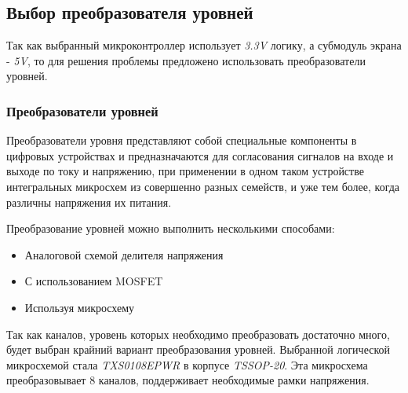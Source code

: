 \subsection{Выбор преобразователя уровней}

Так как выбранный микроконтроллер использует \textit{3.3V} логику, а субмодуль экрана - \textit{5V}, то для решения проблемы предложено использовать преобразователи уровней.

\subsubsection{Преобразователи уровней}
Преобразователи уровня представляют собой специальные компоненты в цифровых устройствах и предназначаются для согласования сигналов на входе и выходе по току и напряжению, при применении в одном таком устройстве интегральных микросхем из совершенно разных семейств, и уже тем более, когда различны напряжения их питания.

Преобразование уровней можно выполнить несколькими способами:
\begin{itemize}
    \item Аналоговой схемой делителя напряжения
    \item С использованием MOSFET
    \item Используя микросхему
\end{itemize}

Так как каналов, уровень которых необходимо преобразовать достаточно много, будет выбран крайний вариант преобразования уровней. Выбранной логической микросхемой стала \textit{TXS0108EPWR} в корпусе \textit{TSSOP-20}. Эта микросхема преобразовывает 8 каналов, поддерживает необходимые рамки напряжения.